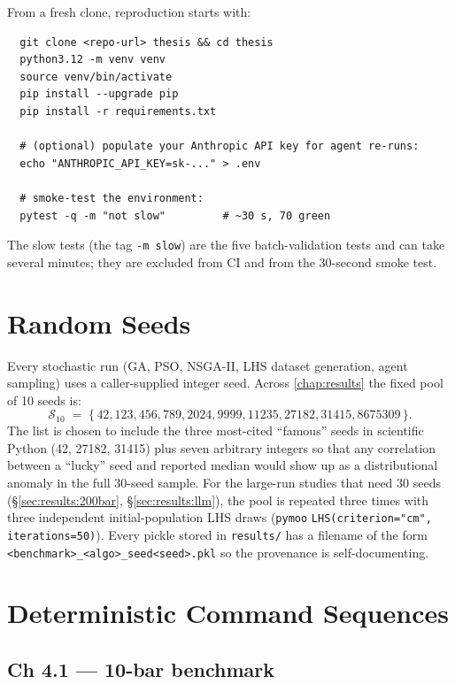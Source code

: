 From a fresh clone, reproduction starts with:
\begin{verbatim}
  git clone <repo-url> thesis && cd thesis
  python3.12 -m venv venv
  source venv/bin/activate
  pip install --upgrade pip
  pip install -r requirements.txt

  # (optional) populate your Anthropic API key for agent re-runs:
  echo "ANTHROPIC_API_KEY=sk-..." > .env

  # smoke-test the environment:
  pytest -q -m "not slow"         # ~30 s, 70 green
\end{verbatim}
The slow tests (the tag \texttt{-m slow}) are the five
batch-validation tests and can take several minutes; they are
excluded from CI and from the 30-second smoke test.

\section{Random Seeds}
\label{app:repro:seeds}

Every stochastic run (GA, PSO, NSGA-II, LHS dataset generation,
agent sampling) uses a caller-supplied integer seed. Across
\cref{chap:results} the fixed pool of 10 seeds is:
\begin{equation}
  \mathcal{S}_{10}
  \;=\;\{\,\num{42},\num{123},\num{456},\num{789},\num{2024},
  \num{9999},\num{11235},\num{27182},\num{31415},\num{8675309}\,\}.
\end{equation}
The list is chosen to include the three most-cited ``famous''
seeds in scientific Python (\num{42}, \num{27182}, \num{31415}) plus
seven arbitrary integers so that any correlation between a
``lucky'' seed and reported median would show up as a
distributional anomaly in the full \num{30}-seed sample.
For the large-run studies that need 30 seeds
(§\ref{sec:results:200bar}, §\ref{sec:results:llm}),
the pool is repeated three times with three independent
initial-population LHS draws
(\texttt{pymoo} \texttt{LHS(criterion="cm", iterations=50)}).
Every pickle stored in \texttt{results/} has a filename of the
form \texttt{<benchmark>\_<algo>\_seed<seed>.pkl} so the
provenance is self-documenting.

\section{Deterministic Command Sequences}
\label{app:repro:commands}

\subsection{Ch 4.1 --- 10-bar benchmark}
\label{app:repro:cmd:10bar}

